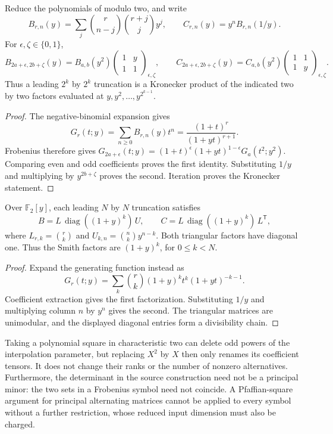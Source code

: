\begin{lemma}\label{lem:binary-crossing}
Reduce the polynomials of \cite[Appendix B]{Anthropic2026} modulo two, and write
\[
 B_{r,n}(y)=\sum_j\binom r{n-j}\binom{r+j}j y^j,
 \qquad C_{r,n}(y)=y^n B_{r,n}(1/y).
\]
For $\epsilon,\zeta\in\{0,1\}$,
\[
 B_{2a+\epsilon,2b+\zeta}(y)=B_{a,b}(y^2)
 \begin{pmatrix}1&y\\1&1\end{pmatrix}_{\epsilon,\zeta},
 \qquad
 C_{2a+\epsilon,2b+\zeta}(y)=C_{a,b}(y^2)
 \begin{pmatrix}1&1\\1&y\end{pmatrix}_{\epsilon,\zeta}.
\]
Thus a leading $2^k$ by $2^k$ truncation is a Kronecker product of the indicated two by two factors evaluated at $y,y^2,\ldots,y^{2^{k-1}}$.
\end{lemma}
\begin{proof}
The negative-binomial expansion gives
\[
 G_r(t;y)=\sum_{n\geq0}B_{r,n}(y)t^n
 =\frac{(1+t)^r}{(1+yt)^{r+1}}.
\]
Frobenius therefore gives
$G_{2a+\epsilon}(t;y)=(1+t)^\epsilon(1+yt)^{1-\epsilon}G_a(t^2;y^2)$.
Comparing even and odd coefficients proves the first identity. Substituting $1/y$ and multiplying by $y^{2b+\zeta}$ proves the second. Iteration proves the Kronecker statement.
\end{proof}

\begin{lemma}\label{lem:pascal-factorization}
Over $\mathbb F_2[y]$, each leading $N$ by $N$ truncation satisfies
\[
 B=L\,\operatorname{diag}((1+y)^k)\,U,\qquad
 C=L\,\operatorname{diag}((1+y)^k)\,L^{\mathsf T},
\]
where $L_{r,k}=\binom rk$ and $U_{k,n}=\binom nk y^{n-k}$. Both triangular factors have diagonal one. Thus the Smith factors are $(1+y)^k$, for $0\leq k<N$.
\end{lemma}
\begin{proof}
Expand the generating function instead as
\[
 G_r(t;y)=\sum_k\binom rk(1+y)^kt^k(1+yt)^{-k-1}.
\]
Coefficient extraction gives the first factorization. Substituting $1/y$ and multiplying column $n$ by $y^n$ gives the second. The triangular matrices are unimodular, and the displayed diagonal entries form a divisibility chain.
\end{proof}

Taking a polynomial square in characteristic two can delete odd powers of the interpolation parameter, but replacing $X^2$ by $X$ then only renames its coefficient tensors. It does not change their ranks or the number of nonzero alternatives. Furthermore, the determinant in the source construction need not be a principal minor: the two sets in a Frobenius symbol need not coincide. A Pfaffian-square argument for principal alternating matrices cannot be applied to every symbol without a further restriction, whose reduced input dimension must also be charged.

